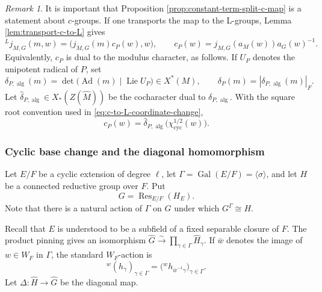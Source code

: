 \documentclass[reqno]{amsart}
\numberwithin{equation}{subsection}
\newcommand{\Gal}{\operatorname{Gal}}
\newcommand{\wh}[1]{\widehat{#1}}
\newcommand{\co}{\colon}
\newcommand{\ld}{{}^L}
\DeclareMathOperator{\cyc}{cyc}
\DeclareMathOperator{\Lie}{Lie}
\DeclareMathOperator{\Res}{Res}
\DeclareMathOperator{\Ad}{Ad}
\DeclareMathOperator{\alg}{alg}
\theoremstyle{remark}
\newtheorem{remark}[thm]{Remark}
\numberwithin{equation}{subsection}
\numberwithin{figure}{subsection}
\begin{document}
\begin{remark}\label{rem:L-group-CT-dual}
It is important that Proposition \ref{prop:constant-term-split-c-map} is a
statement about $c$-groups.  If one transports the map to the L-groups, Lemma
\ref{lem:transport-c-to-L} gives
\begin{equation}\label{eq:constant-term-usual-L-formula}
\ld j_{M,G}(m,w)
=\bigl(j_{M,G}(m)c_P(w),w\bigr),
\qquad
c_P(w)=j_{M,G}(a_M(w))a_G(w)^{-1}.
\end{equation}
Equivalently, \(c_P\) is dual to the modulus character, as follows. If \(U_P\) denotes
the unipotent radical of \(P\), set
\[
\delta_{P,\alg}(m)
=\det\!\bigl(\Ad(m)\mid\Lie U_P\bigr)\in X^*(M),
\qquad
\delta_P(m)=|\delta_{P,\alg}(m)|_F.
\]
Let \(\wh\delta_{P,\alg}\in X_*(Z(\wh M))\) be the cocharacter dual to
\(\delta_{P,\alg}\).  With the square root convention used in
\eqref{eq:c-to-L-coordinate-change},
\[
c_P(w)=\wh\delta_{P,\alg}\bigl(\chi_{\cyc}^{1/2}(w)\bigr).
\]
\end{remark}

\subsubsection{Cyclic base change and the diagonal homomorphism}
\label{sssec:cyclic-base-change-diagonal}

Let $E/F$ be a cyclic extension of degree $\ell$, let
$\Gamma=\Gal(E/F)=\langle\sigma\rangle$, and let $H$ be a connected
reductive group over $F$.  Put
\[
G=\Res_{E/F}(H_E).
\]
Note that there is a natural action of $\Gamma$ on $G$ under which $G^\Gamma \cong H$.

Recall that $E$ is understood to be a subfield of a fixed separable closure of $F$. The product pinning gives an
isomorphism $\wh G\xrightarrow{\sim}
\prod_{\gamma\in\Gamma}\wh H_\gamma$.
If $\bar w$ denotes the image of $w\in W_F$ in $\Gamma$, the standard
$W_F$-action is
\begin{equation}\label{eq:Weil-action-on-induced-dual}
{}^w(h_\gamma)_{\gamma\in\Gamma}
=\bigl({}^w h_{\bar w^{-1}\gamma}\bigr)_{\gamma\in\Gamma}.
\end{equation}
Let $\Delta\co\wh H\longrightarrow\wh G$ be the diagonal map. %
\end{document}
